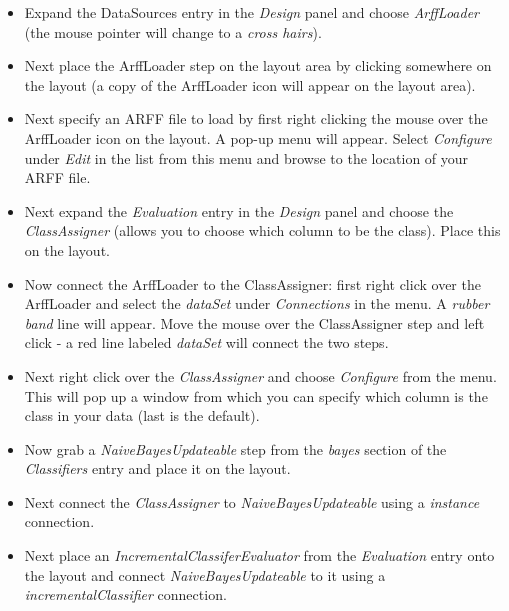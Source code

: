 \begin{itemize}
        \item Expand the DataSources entry in the \textit{Design}
          panel and choose \textit{ArffLoader} (the mouse pointer will
          change to a \textit{cross hairs}).

	\item Next place the ArffLoader step on the layout area by clicking
	somewhere on the layout (a copy of the ArffLoader icon will appear on
	the layout area).

	\item Next specify an ARFF file to load by first right clicking the mouse
	over the ArffLoader icon on the layout. A pop-up menu will
	appear. Select \textit{Configure} under \textit{Edit} in the list from this menu and
	browse to the location of your ARFF file.

	\item Next expand the \textit{Evaluation} entry in the
          \textit{Design} panel and choose the \textit{ClassAssigner}
          (allows you to choose which column to be the class). Place
          this on the layout.

	\item Now connect the ArffLoader to the ClassAssigner: first right click
	over the ArffLoader and select the \textit{dataSet} under \textit{Connections} in
	the menu. A \textit{rubber band} line will appear. Move the mouse over the
	ClassAssigner step and left click - a red line labeled \textit{dataSet}
	will connect the two steps.

	\item Next right click over the \textit{ClassAssigner} and choose \textit{Configure} from
	the menu. This will pop up a window from which you can specify which
	column is the class in your data (last is the default).

        \item Now grab a \textit{NaiveBayesUpdateable} step from the \textit{bayes}
        section of the \textit{Classifiers} entry and place it on the layout.

        \item Next connect the \textit{ClassAssigner} to \textit{NaiveBayesUpdateable}
        using a \textit{instance} connection.

        \item Next place an \textit{IncrementalClassiferEvaluator} from the \textit{Evaluation}
        entry onto the layout and connect \textit{NaiveBayesUpdateable} to it using a
        \textit{incrementalClassifier} connection.


\end{itemize}
